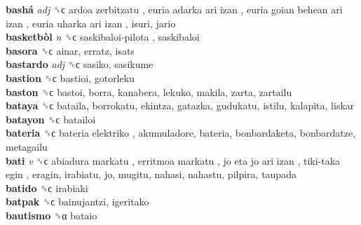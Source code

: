 \textbf{bashá} \emph{adj}  ␝ϲ   ardoa zerbitzatu ,  euria adarka ari izan ,  euria goian behean ari izan ,  euria uharka ari izan , isuri, jario  \\
\textbf{basketbòl} \emph{n}  ␝ϲ   saskibaloi-pilota , saskibaloi  \\
\textbf{basora} ␝ϲ  ainar, erratz, isats  \\
\textbf{bastardo} \emph{adj}  ␝ϲ  sasiko, sasikume  \\
\textbf{bastion} ␝ϲ  bastioi, gotorleku  \\
\textbf{baston} ␝ϲ  bastoi, borra, kanabera, lekuko, makila, zarta, zartailu  \\
\textbf{bataya} ␝ϲ  bataila, borrokatu, ekintza, gatazka, gudukatu, istilu, kalapita, liskar  \\
\textbf{batayon} ␝ϲ  batailoi  \\
\textbf{bateria} ␝ϲ   bateria elektriko , akumuladore, bateria, bonbardaketa, bonbardatze, metagailu  \\
\textbf{bati} \emph{v}  ␝ϲ   abiadura markatu ,  erritmoa markatu ,  jo eta jo ari izan ,  tiki-taka egin , eragin, irabiatu, jo, mugitu, nahasi, nahastu, pilpira, taupada  \\
\textbf{batido} ␝ϲ  irabiaki  \\
\textbf{batpak} ␝ϲ  bainujantzi, igeritako  \\
\textbf{bautismo} ␝α  bataio  \\
